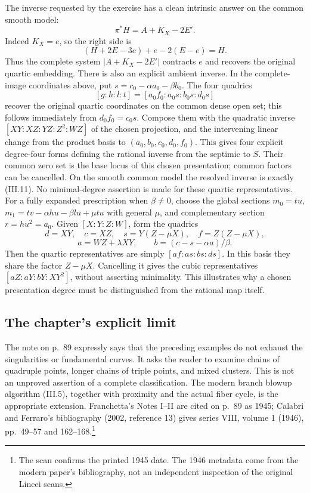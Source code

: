 The inverse requested by the exercise has a clean intrinsic answer on the common smooth model: \[
\pi^*H=A+K_X-2E'.
\tag{III.11}
\] Indeed \(K_X=e\), so the right side is \[
(H+2E-3e)+e-2(E-e)=H.
\] Thus the complete system \(|A+K_X-2E'|\) contracts \(e\) and recovers the original quartic embedding. There is also an explicit ambient inverse. In the complete-image coordinates above, put \(s=c_0-\alpha a_0-\beta b_0\). The four quadrics \[
[g:h:l:t]=[a_0f_0:a_0s:b_0s:d_0s]
\tag{III.11a}
\] recover the original quartic coordinates on the common dense open set; this follows immediately from \(d_0f_0=c_0s\). Compose them with the quadratic inverse \([XY:XZ:YZ:Z^2:WZ]\) of the chosen projection, and the intervening linear change from the product basis to \((a_0,b_0,c_0,d_0,f_0)\). This gives four explicit degree-four forms defining the rational inverse from the septimic to \(S\). Their common zero set is the base locus of this chosen presentation; common factors can be cancelled. On the smooth common model the resolved inverse is exactly (III.11). No minimal-degree assertion is made for these quartic representatives. For a fully expanded prescription when \(\beta\ne0\), choose the global sections \(m_0=tu\), \(m_1=tv-\alpha hu-\beta lu+\mu tu\) with general \(\mu\), and complementary section \(r=hu^2=a_0\). Given \([X:Y:Z:W]\), form the quadrics \[
d=XY,\quad c=XZ,\quad s=Y(Z-\mu X),\quad f=Z(Z-\mu X),
\] \[
a=WZ+\lambda XY,\qquad b=(c-s-\alpha a)/\beta.
\] Then the quartic representatives are simply \([af:as:bs:ds]\). In this basis they share the factor \(Z-\mu X\). Cancelling it gives the cubic representatives \([aZ:aY:bY:XY^2]\), without asserting minimality. This illustrates why a chosen presentation degree must be distinguished from the rational map itself.

\subsection{The chapter's explicit limit}

The note on p.~89 expressly says that the preceding examples do not exhaust the singularities or fundamental curves. It asks the reader to examine chains of quadruple points, longer chains of triple points, and mixed clusters. This is not an unproved assertion of a complete classification. The modern branch blowup algorithm (III.5), together with proximity and the actual fiber cycle, is the appropriate extension. Franchetta's Notes I--II are cited on p.~89 as 1945; Calabri and Ferraro's bibliography (2002, reference 13) gives series VIII, volume 1 (1946), pp.~49--57 and 162--168.\footnote{The scan confirms the printed 1945 date. The 1946 metadata come from the modern paper's bibliography, not an independent inspection of the original Lincei scans.}

